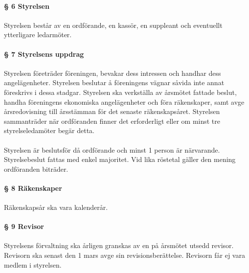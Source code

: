 \documentclass[12pt, a4paper]{article}
\begin{document}
\pagebreak


\paragraph{§ 6 Styrelsen}
\paragraph{}
Styrelsen består av en ordförande, en kassör, en suppleant och eventuellt ytterligare ledarmöter.

\paragraph{§ 7 Styrelsens uppdrag}
\paragraph{}
Styrelsen företräder föreningen, bevakar dess intressen och handhar dess angelägenheter. Styrelsen beslutar å föreningens vägnar såvida inte annat
föreskrivs i dessa stadgar. Styrelsen ska verkställa av årsmötet fattade beslut, handha föreningens ekonomiska angelägenheter och föra räkenskaper,
samt avge årsredovisning till årsstämman för det senaste räkenskapsåret. Styrelsen sammanträder när ordföranden finner det erforderligt eller om
minst tre styrelseledamöter begär detta.

\paragraph{}
Styrelsen är beslutsför då ordförande och minst 1 person är närvarande. Styrelsebeslut fattas med enkel majoritet. Vid lika röstetal gäller den mening
ordföranden biträder.

\paragraph{§ 8 Räkenskaper}
\paragraph{}
Räkenskapsår ska vara kalenderår.

\paragraph{§ 9 Revisor}
\paragraph{}
Styrelsens förvaltning ska årligen granskas av en på årsmötet utsedd revisor. Revisorn ska senast den 1 mars avge sin revisionsberättelse. Revisorn får ej vara medlem i styrelsen.
\end{document}
